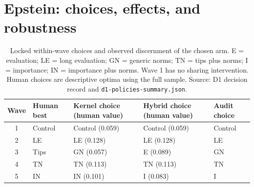 \documentclass[11pt]{article}
\begin{document}
\section{Epstein: choices, effects, and robustness}\label{app:epstein}
\begin{table}[!htbp]
\centering\small
\caption{Locked within-wave choices and observed discernment of the chosen arm. E = evaluation; LE = long evaluation; GN = generic norms; TN = tips plus norms; I = importance; IN = importance plus norms. Wave 1 has no sharing intervention. Human choices are descriptive optima using the full sample. Source: D1 decision record and \texttt{d1-policies-summary.json}.}
\begin{tabular}{cllll}
\toprule
Wave & Human best & Kernel choice (human value) & Hybrid choice (human value) & Audit choice\\
\midrule
1 & Control & Control (0.059) & Control (0.059) & Control\\
2 & LE & LE (0.128) & LE (0.128) & LE\\
3 & Tips & GN (0.057) & E (0.089) & GN\\
4 & TN & TN (0.113) & TN (0.113) & TN\\
5 & IN & IN (0.101) & I (0.083) & I\\
\bottomrule
\end{tabular}
\end{table}
\end{document}
